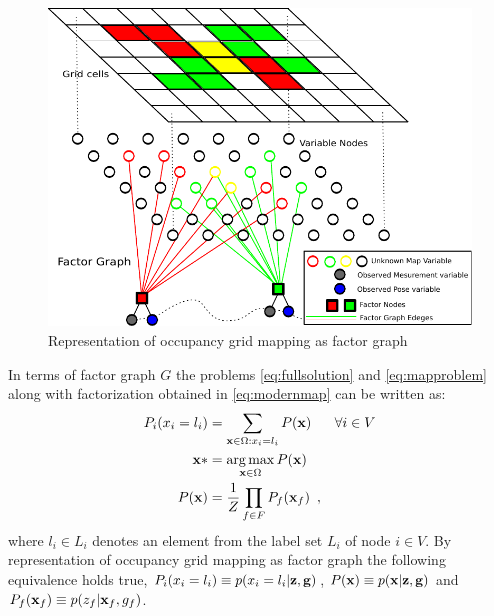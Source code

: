 \documentclass[letterpaper, 10 pt, conference]{ieeeconf} %
\DeclareMathOperator*{\argmax}{arg\,max}
\begin{document}
\begin{figure}
  \includegraphics[width=\columnwidth]{../figures/factorgraph/factorgraph3.pdf}
  \caption{Representation of occupancy grid mapping as factor graph}
  \label{fig:factor-graph}
\end{figure}

%
%
In terms of factor graph $G$ the problems \eqref{eq:fullsolution} and
\eqref{eq:mapproblem} along with factorization obtained in
\eqref{eq:modernmap} can be written as:
\begin{align}
  P_i(x_i = l_i) &= \sum_{\map \in \Omega : x_i = l_i} P(\map) & \forall i \in V
  \label{eq:marginalgeneric}
  \\
     \map* &= \argmax_{\map \in \Omega} P(\map)
  \label{eq:mapgeneric}
  \\
   P(\map) &= \frac{1}{Z}\prod_{f \in F} P_f(\map_f)
   \enspace,
  \label{eq:factorizationgeneric}
\end{align}
where  $l_i \in L_i$ denotes an element from the label set $L_i$ of node $i \in V$.
By representation of occupancy grid mapping as factor graph the following
equivalence holds true, $P_i(x_i = l_i) \equiv p(x_i
= l_i|\mathbf{z}, \mathbf{g})$, $P(\mathbf{x}) \equiv p(\mathbf{x}|\mathbf{z}, \mathbf{g})$ and 
$P_f(\mathbf{x}_f) \equiv p(z_f|\mathbf{x}_f, g_f)$.
\end{document}
